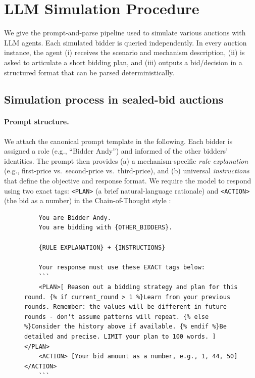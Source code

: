 \documentclass[acmsmall,screen,review]{acmart}
\begin{document}
\begin{table}[htbp]
\centering
\resizebox{\linewidth}{!}{}
\caption{Reconstruction-uncertainty bands on the human SMAD anchors (parametric bootstrap over the fitted mixture parameters, $B=2000$; 68\% and 95\% percentile bands). Common-value anchors have no reconstruction band because they are profit-based moments taken directly from the source.}
\label{tab:bands}
\end{table}

\section{LLM Simulation Procedure}

We give the prompt-and-parse pipeline used to simulate various auctions with LLM agents. Each simulated bidder is queried independently. In every auction instance, the agent (i) receives the scenario and mechanism description, (ii) is asked to articulate a short bidding plan, and (iii) outputs a bid/decision in a structured format that can be parsed deterministically.


\subsection{Simulation process in sealed-bid auctions}\label{app:process}

\paragraph{Prompt structure.}
We attach the canonical prompt template in the following. Each bidder is assigned a role (e.g., ``Bidder Andy'') and informed of the other bidders' identities. The prompt then provides (a) a mechanism-specific \emph{rule explanation} (e.g., first-price vs.\ second-price vs.\ third-price), and (b) universal \emph{instructions} that define the objective and response format. We require the model to respond using two exact tags: \verb|<PLAN>| (a brief natural-language rationale) and \verb|<ACTION>| (the bid as a number) in the Chain-of-Thought style \citep{wei2022chain}:


\begin{figure}[htbp]
\centering
\begin{minipage}{0.95\textwidth}
\begin{lstlisting}
    You are Bidder Andy.
    You are bidding with {OTHER_BIDDERS}.

    {RULE EXPLANATION} + {INSTRUCTIONS}

    Your response must use these EXACT tags below:
    ```
    <PLAN>[ Reason out a bidding strategy and plan for this round. {% if current_round > 1 %}Learn from your previous rounds. Remember: the values will be different in future rounds - don't assume patterns will repeat. {% else %}Consider the history above if available. {% endif %}Be detailed and precise. LIMIT your plan to 100 words. ] </PLAN>
    <ACTION> [Your bid amount as a number, e.g., 1, 44, 50] </ACTION>
    ```
\end{lstlisting}
\end{minipage}
\end{figure}
\end{document}
